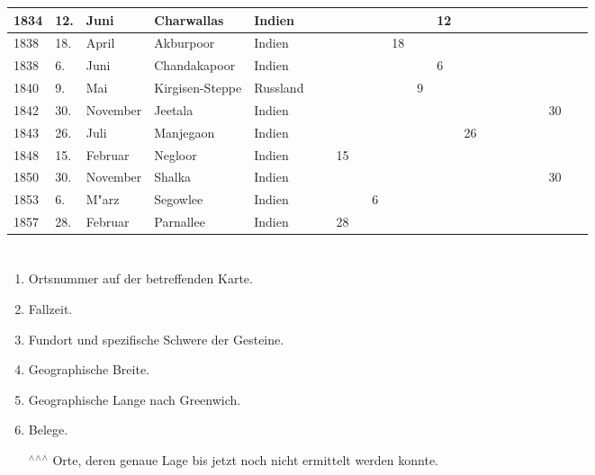 \documentclass[a4paper, 8pt, oneside, polutonikogreek, german]{article}
\begin{document}
\begin{landscape}
\begin{table}[H]
\begin{longtable}{|l|l|l|l|l|l|l|l|l|l|l|l|l|l|l|l|l|}
        1834 & 12. & Juni & Charwallas & Indien & ~ & ~ & ~ & ~ & ~ & 12 & ~ & ~ & ~ & ~ & ~ & ~ \\ \hline
        1838 & 18. & April & Akburpoor & Indien & ~ & ~ & ~ & 18 & ~ & ~ & ~ & ~ & ~ & ~ & ~ & ~ \\ \hline
        1838 & 6. & Juni & Chandakapoor & Indien & ~ & ~ & ~ & ~ & ~ & 6 & ~ & ~ & ~ & ~ & ~ & ~ \\ \hline
        1840 & 9. & Mai & Kirgisen-Steppe & Russland & ~ & ~ & ~ & ~ & 9 & ~ & ~ & ~ & ~ & ~ & ~ & ~ \\ \hline
        1842 & 30. & November & Jeetala & Indien & ~ & ~ & ~ & ~ & ~ & ~ & ~ & ~ & ~ & ~ & 30 & ~ \\ \hline
        1843 & 26. & Juli & Manjegaon & Indien & ~ & ~ & ~ & ~ & ~ & ~ & 26 & ~ & ~ & ~ & ~ & ~ \\ \hline
        1848 & 15. & Februar & Negloor & Indien & ~ & 15 & ~ & ~ & ~ & ~ & ~ & ~ & ~ & ~ & ~ & ~ \\ \hline
        1850 & 30. & November & Shalka & Indien & ~ & ~ & ~ & ~ & ~ & ~ & ~ & ~ & ~ & ~ & 30 & ~ \\ \hline
        1853 & 6. & M"arz & Segowlee & Indien & ~ & ~ & 6 & ~ & ~ & ~ & ~ & ~ & ~ & ~ & ~ & ~ \\ \hline
        1857 & 28. & Februar & Parnallee & Indien & ~ & 28 ~ & ~ & ~ & ~ & ~ & ~ & ~ & ~ & ~ & ~ & ~ \\ \hline
    \end{longtable}
\end{table}
\end{landscape}
\clearpage
\section{}
\begin{enumerate}
    \item Ortsnummer auf der betreffenden Karte.
    \item Fallzeit.
    \item Fundort und spezifische Schwere der Gesteine.
    \item Geographische Breite.
    \item Geographische Lange nach Greenwich.
    \item Belege.
    \item[$^\wedge$$^\wedge$$^\wedge$] Orte, deren genaue Lage bis jetzt noch nicht ermittelt werden konnte.
\end{enumerate}
\clearpage
\end{document}
